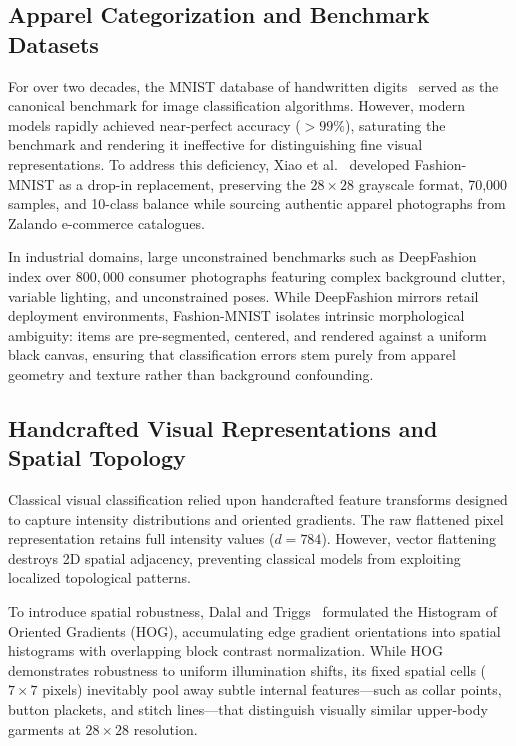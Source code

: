 \documentclass[conference]{IEEEtran}
\begin{document}
\subsection{Apparel Categorization and Benchmark Datasets}
For over two decades, the MNIST database of handwritten digits~\cite{lecun1998gradient} served as the canonical benchmark for image classification algorithms. However, modern models rapidly achieved near-perfect accuracy ($>99\%$), saturating the benchmark and rendering it ineffective for distinguishing fine visual representations. To address this deficiency, Xiao et al.~\cite{xiao2017fashionmnist} developed Fashion-MNIST as a drop-in replacement, preserving the $28\times28$ grayscale format, 70,000 samples, and 10-class balance while sourcing authentic apparel photographs from Zalando e-commerce catalogues.

In industrial domains, large unconstrained benchmarks such as DeepFashion~\cite{liu2016deepfashion} index over $800{,}000$ consumer photographs featuring complex background clutter, variable lighting, and unconstrained poses. While DeepFashion mirrors retail deployment environments, Fashion-MNIST isolates intrinsic morphological ambiguity: items are pre-segmented, centered, and rendered against a uniform black canvas, ensuring that classification errors stem purely from apparel geometry and texture rather than background confounding.

\subsection{Handcrafted Visual Representations and Spatial Topology}
Classical visual classification relied upon handcrafted feature transforms designed to capture intensity distributions and oriented gradients. The raw flattened pixel representation retains full intensity values ($d=784$). However, vector flattening destroys 2D spatial adjacency, preventing classical models from exploiting localized topological patterns.

To introduce spatial robustness, Dalal and Triggs~\cite{dalal2005histograms} formulated the Histogram of Oriented Gradients (HOG), accumulating edge gradient orientations into spatial histograms with overlapping block contrast normalization. While HOG demonstrates robustness to uniform illumination shifts, its fixed spatial cells ($7\times7$ pixels) inevitably pool away subtle internal features---such as collar points, button plackets, and stitch lines---that distinguish visually similar upper-body garments at $28\times28$ resolution.
\end{document}
